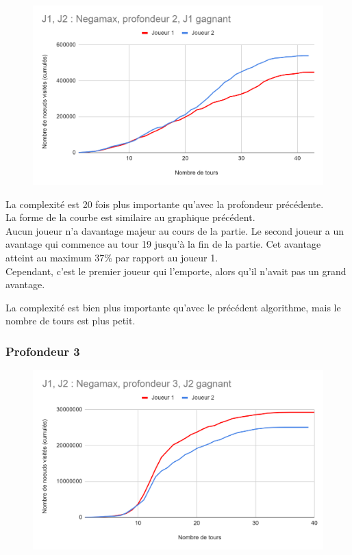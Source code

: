 \documentclass[12pt]{article}
\begin{document}
\begin{figure}[!h]
   \includegraphics[width=\textwidth]{prof2negamax.png}
\end{figure}

La complexité est 20 fois plus importante qu’avec la profondeur précédente.\\
La forme de la courbe est similaire au graphique précédent.\\
Aucun joueur n’a davantage majeur au cours de la partie. Le second joueur a un avantage qui commence au tour 19 jusqu'à la fin de la partie. Cet avantage atteint au maximum 37\% par rapport au joueur 1. \\
Cependant, c’est le premier joueur qui l’emporte, alors qu’il n’avait pas un grand avantage.

La complexité est bien plus importante qu'avec le précédent algorithme, mais le nombre de tours est plus petit.

\newpage
\subsubsection{Profondeur 3}

\begin{figure}[!h]
   \includegraphics[width=\textwidth]{prof3negamax.png}
\end{figure}
\end{document}
